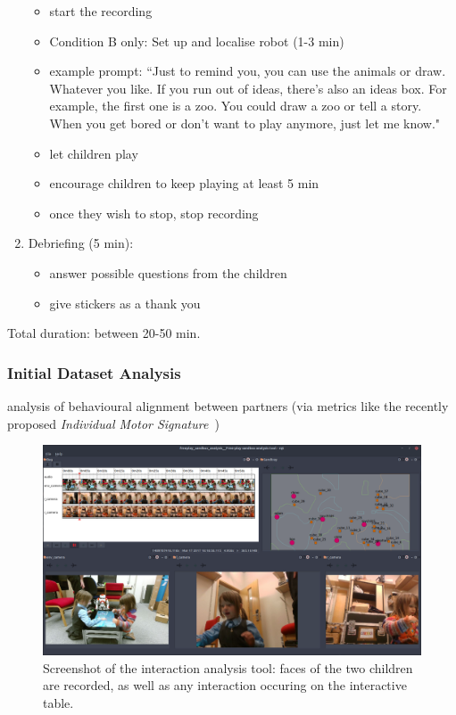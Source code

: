 \documentclass{article}
\begin{document}
\begin{enumerate}
  \begin{itemize}
  \item
    start the recording
  \item 
     Condition B only: Set up and localise robot (1-3 min)
  \item
    example prompt: ``Just to remind you, you can use the animals or draw. Whatever you like. 
    If you run out of ideas, there's also an ideas box. For example, the first one is a zoo. You could draw a zoo or tell a story. 
    When you get bored or 
    don't want to play anymore, just let me know."
  \item
    let children play
  \item
    encourage children to keep playing at least 5 min
  \item
    once they wish to stop, stop recording
  \end{itemize}
\item
  Debriefing (5 min):
  
  \begin{itemize}
  \item
    answer possible questions from the children
  \item
    give stickers as a thank you
  \end{itemize}
\end{enumerate}


Total duration: between 20-50 min.

\subsubsection{Initial Dataset Analysis}

analysis of behavioural alignment between partners (via
metrics like the recently proposed \emph{Individual Motor
Signature}~\cite{slowinski2016dynamic})

\begin{figure}
    \centering
    \includegraphics[width=\linewidth]{analysis}
    \caption{Screenshot of the interaction analysis tool: faces of the two
    children are recorded, as well as any interaction occuring on the
    interactive table.}
    \label{fig|analysis}
\end{figure}
\end{document}
